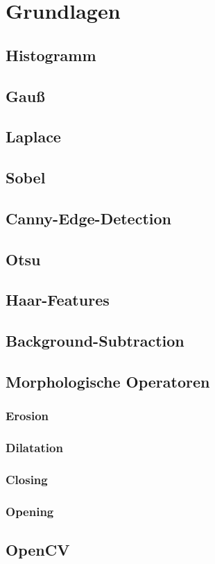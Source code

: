 \chapter{Grundlagen}

\section{Histogramm}

\section{Gauß}

\section{Laplace}

\section{Sobel}

\section{Canny-Edge-Detection}

\section{Otsu}

\section{Haar-Features}

\section{Background-Subtraction}

\section{Morphologische Operatoren}
\subsection{Erosion}
\subsection{Dilatation}
\subsection{Closing}
\subsection{Opening}

\section{OpenCV}